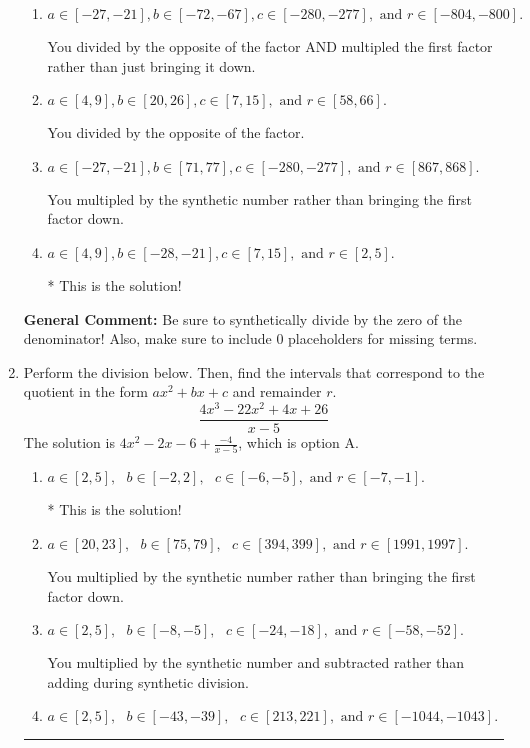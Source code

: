 \documentclass{extbook}[14pt]
\newcommand{\litem}[1]{\item #1

\rule{\textwidth}{0.4pt}}
\begin{document}
\begin{enumerate}
{\begin{enumerate}[label=\Alph*.]
 You multipled by the synthetic number and subtracted rather than adding during synthetic division.
\item \( a \in [-27, -21], b \in [-72, -67], c \in [-280, -277], \text{ and } r \in [-804, -800]. \)

 You divided by the opposite of the factor AND multipled the first factor rather than just bringing it down.
\item \( a \in [4, 9], b \in [20, 26], c \in [7, 15], \text{ and } r \in [58, 66]. \)

 You divided by the opposite of the factor.
\item \( a \in [-27, -21], b \in [71, 77], c \in [-280, -277], \text{ and } r \in [867, 868]. \)

 You multipled by the synthetic number rather than bringing the first factor down.
\item \( a \in [4, 9], b \in [-28, -21], c \in [7, 15], \text{ and } r \in [2, 5]. \)

* This is the solution!
\end{enumerate}

\textbf{General Comment:} Be sure to synthetically divide by the zero of the denominator! Also, make sure to include 0 placeholders for missing terms.
}
\litem{
Perform the division below. Then, find the intervals that correspond to the quotient in the form $ax^2+bx+c$ and remainder $r$.
\[ \frac{4x^{3} -22 x^{2} +4 x + 26}{x -5} \]The solution is \( 4x^{2} -2 x -6 + \frac{-4}{x -5} \), which is option A.\begin{enumerate}[label=\Alph*.]
\item \( a \in [2, 5], \text{   } b \in [-2, 2], \text{   } c \in [-6, -5], \text{   and   } r \in [-7, -1]. \)

* This is the solution!
\item \( a \in [20, 23], \text{   } b \in [75, 79], \text{   } c \in [394, 399], \text{   and   } r \in [1991, 1997]. \)

 You multiplied by the synthetic number rather than bringing the first factor down.
\item \( a \in [2, 5], \text{   } b \in [-8, -5], \text{   } c \in [-24, -18], \text{   and   } r \in [-58, -52]. \)

 You multiplied by the synthetic number and subtracted rather than adding during synthetic division.
\item \( a \in [2, 5], \text{   } b \in [-43, -39], \text{   } c \in [213, 221], \text{   and   } r \in [-1044, -1043]. \)


\end{enumerate}}
\end{enumerate}
\end{document}

